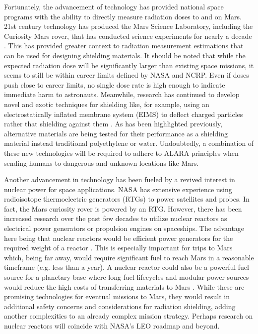 Fortunately, the advancement of technology has provided national space programs with the ability to directly measure radiation doses to and on Mars. 21st century technology has produced the Mars Science Laboratory, including the Curiosity Mars rover, that has conducted science experiments for nearly a decade \cite{durante}. This has provided greater context to radiation measurement estimations that can be used for designing shielding materials. It should be noted that while the expected radiation dose will be significantly larger than existing space missions, it seems to still be within career limits defined by NASA and NCRP. Even if doses push close to career limits, no single dose rate is high enough to indicate immediate harm to astronauts. Meanwhile, research has continued to develop novel and exotic techniques for shielding like, for example, using an electrostatically inflated membrane system (EIMS) to deflect charged particles rather that shielding against them \cite{tripathi}. As has been highlighted previously, alternative materials are being tested for their performance as a shielding material instead traditional polyethylene or water. Undoubtedly, a combination of these new technologies will be required to adhere to ALARA principles when sending humans to dangerous and unknown locations like Mars.

Another advancement in technology has been fueled by a revived interest in nuclear power for space applications. NASA has extensive experience using radioisotope thermoelectric generators (RTGs) to power satellites and probes. In fact, the Mars curiosity rover is powered by an RTG. However, there has been increased research over the past few decades to utilize nuclear reactors as electrical power generators \cite{gibson} or propulsion engines \cite{gates} on spaceships. The advantage here being that nuclear reactors would be efficient power generators for the required weight of a reactor \cite{li-et-al}. This is especially important for trips to Mars which, being far away, would require significant fuel to reach Mars in a reasonable timeframe (e.g. less than a year). A nuclear reactor could also be a powerful fuel source for a planetary base where long fuel lifecycles and modular power sources would reduce the high costs of transferring materials to Mars \cite{schillo}. While these are promising technologies for eventual missions to Mars, they would result in additional safety concerns and considerations for radiation shielding, adding another complexities to an already complex mission strategy. Perhaps research on nuclear reactors will coincide with NASA’s LEO roadmap \cite{nasa-propulsion} and beyond.

